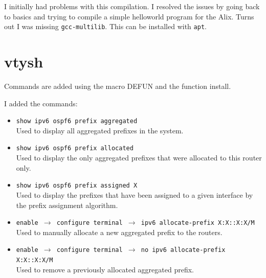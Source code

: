 I initially had problems with this compilation. I resolved the issues by going
back to basics and trying to compile a simple helloworld program for the Alix.
Turns out I was missing \texttt{gcc-multilib}. This can be installed with \texttt{apt}.

\chapter{vtysh}
\label{vtysh}
Commands are added using the macro DEFUN and the function install.

I added the commands:
\begin{itemize}
	\item \texttt{show ipv6 ospf6 prefix aggregated} \\
		Used to display all aggregated prefixes in the system.
	\item \texttt{show ipv6 ospf6 prefix allocated} \\ 
		Used to display the only aggregated prefixes that were allocated to this
		router only.
	\item \texttt{show ipv6 ospf6 prefix assigned X} \\
		Used to display the prefixes that have been assigned to a given interface
		by the prefix assignment algorithm. 


	\item \texttt{enable $\rightarrow$ configure terminal 
		$\rightarrow$ ipv6 allocate-prefix X:X::X:X/M} \\
		Used to manually allocate a new aggregated prefix to the routers.
	\item \texttt{enable $\rightarrow$ configure terminal
		$\rightarrow$ no ipv6 allocate-prefix X:X::X:X/M} \\
		Used to remove a previously allocated aggregated prefix.
\end{itemize}
